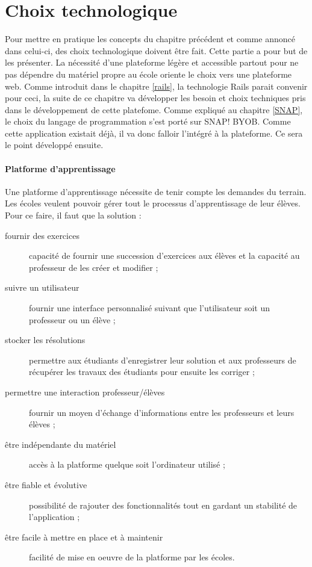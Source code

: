 \section{Choix technologique}
Pour mettre en pratique les concepts du chapitre précédent et comme annoncé dans celui-ci, des choix technologique doivent être fait. Cette partie a pour but de les présenter. La nécessité d'une plateforme légère et accessible partout pour ne pas dépendre du matériel propre au école oriente le choix vers une plateforme web. Comme introduit dans le chapitre \ref{rails}, la technologie Rails parait convenir pour ceci, la suite de ce chapitre va développer les besoin et choix techniques pris dans le développement de cette platefome. 
Comme expliqué au chapitre \ref{SNAP}, le choix du langage de programmation s'est porté sur SNAP! BYOB. Comme cette application existait déjà, il va donc falloir l'intégré à la plateforme. Ce sera le point développé ensuite.


\paragraph{Platforme d'apprentissage}
Une platforme d'apprentissage nécessite de tenir compte les demandes du terrain. Les écoles veulent pouvoir gérer tout le processus d'apprentissage de leur élèves. Pour ce faire, il faut que la solution :
\begin{description}
  \item[fournir des exercices] capacité de fournir une succession d'exercices aux élèves et la capacité au professeur de les créer et modifier ;
  \item[suivre un utilisateur] fournir une interface personnalisé suivant que l'utilisateur soit un professeur ou un élève ;
  \item[stocker les résolutions] permettre aux étudiants d'enregistrer leur solution et aux professeurs de récupérer les travaux des étudiants pour ensuite les corriger ;
  \item[permettre une interaction professeur/élèves] fournir un moyen d'échange d'informations entre les professeurs et leurs élèves ;
  \item[être indépendante du matériel] accès à la platforme quelque soit l'ordinateur utilisé ;
  \item[être fiable et évolutive] possibilité de rajouter des fonctionnalités tout en gardant un stabilité de l'application ;
  \item[être facile à mettre en place et à maintenir] facilité de mise en oeuvre de la platforme par les écoles.
\end{description}


